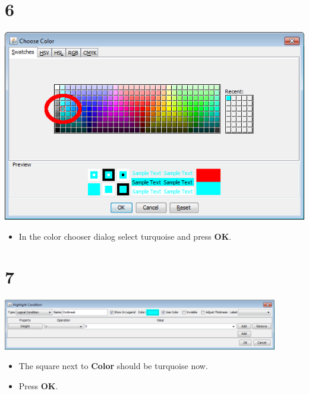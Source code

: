 \documentclass{beamer}
\begin{document}
\section{6}
\begin{frame}
	\begin{center}
  		\includegraphics[height=0.6\textheight]{6.png}
	\end{center}
	\begin{itemize}
		\item In the color chooser dialog select turquoise and press \textbf{OK}.
	\end{itemize}
\end{frame}

\section{7}
\begin{frame}
	\begin{center}
  		\includegraphics[width=0.9\textwidth]{7.png}
	\end{center}
	\begin{itemize}
		\item The square next to \textbf{Color} should be turquoise now.
		\item Press \textbf{OK}.
	\end{itemize}
\end{frame}
\end{document}
